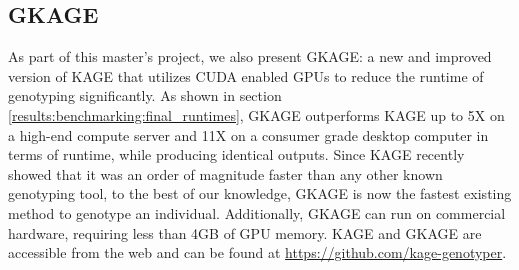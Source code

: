 \subsection{GKAGE} \label{results:gkage}




As part of this master's project, we also present GKAGE: a new and improved version of KAGE that utilizes CUDA enabled GPUs to reduce the runtime of genotyping significantly.
As shown in section \ref{results:benchmarking:final_runtimes}, GKAGE outperforms KAGE up to 5X on a high-end compute server and 11X on a consumer grade desktop computer in terms of runtime, while producing identical outputs.
Since KAGE recently showed that it was an order of magnitude faster than any other known genotyping tool, to the best of our knowledge, GKAGE is now the fastest existing method to genotype an individual.
Additionally, GKAGE can run on commercial hardware, requiring less than 4GB of GPU memory.
KAGE and GKAGE are accessible from the web and can be found at \url{https://github.com/kage-genotyper}.

